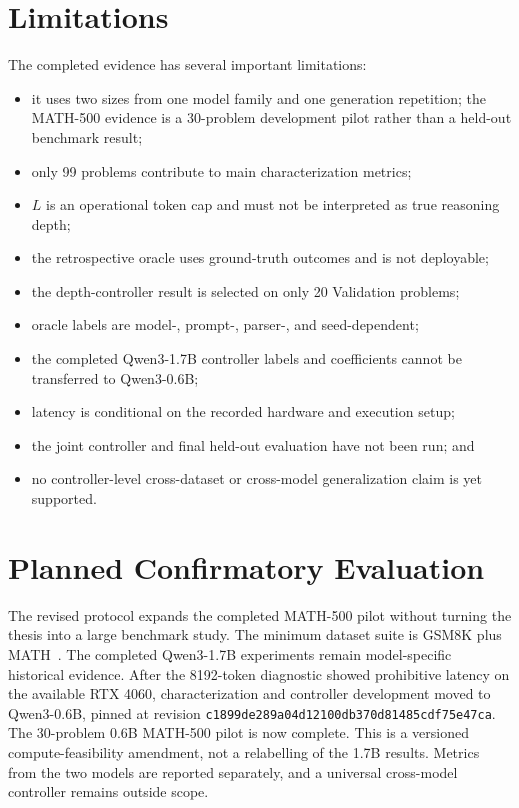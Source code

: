 \documentclass[runningheads]{llncs}
\begin{document}
\section{Limitations}

The completed evidence has several important limitations:
\begin{itemize}
  \item it uses two sizes from one model family and one generation repetition;
  the MATH-500 evidence is a 30-problem development pilot rather than a held-out
  benchmark result;
  \item only 99 problems contribute to main characterization metrics;
  \item $L$ is an operational token cap and must not be interpreted as true
  reasoning depth;
  \item the retrospective oracle uses ground-truth outcomes and is not
  deployable;
  \item the depth-controller result is selected on only 20 Validation problems;
  \item oracle labels are model-, prompt-, parser-, and seed-dependent;
  \item the completed Qwen3-1.7B controller labels and coefficients cannot be
  transferred to Qwen3-0.6B;
  \item latency is conditional on the recorded hardware and execution setup;
  \item the joint controller and final held-out evaluation have not been run;
  and
  \item no controller-level cross-dataset or cross-model generalization claim
  is yet supported.
\end{itemize}

\section{Planned Confirmatory Evaluation}

The revised protocol expands the completed MATH-500 pilot without turning the
thesis into a large benchmark study. The minimum dataset suite is GSM8K plus
MATH~\cite{hendrycks2021math}. The completed Qwen3-1.7B experiments remain
model-specific historical evidence. After the 8192-token diagnostic showed
prohibitive latency on the available RTX 4060, characterization and controller
development moved to Qwen3-0.6B, pinned at revision
\texttt{c1899de289a04d12100db370d81485cdf75e47ca}. The 30-problem 0.6B
MATH-500 pilot is now complete. This is a versioned compute-feasibility
amendment, not a relabelling of the 1.7B results. Metrics from the two models
are reported separately, and a universal cross-model controller remains
outside scope.
\end{document}

